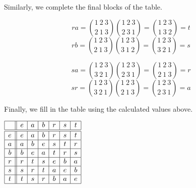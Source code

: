 \documentclass[12pt]{article}
\begin{document}
Similarly, we complete the final blocks of the table.

$$ ra ={ 1\ 2\ 3 \choose 2\ 1\ 3}{ 1\ 2\ 3 \choose 2\ 3\ 1}={ 1\ 2\ 3 \choose 1\ 3\ 2}= t$$
$$ rb ={ 1\ 2\ 3 \choose 2\ 1\ 3}{ 1\ 2\ 3 \choose 3\ 1\ 2}={ 1\ 2\ 3 \choose 3\ 2\ 1}= s$$

$$ sa ={ 1\ 2\ 3 \choose 3\ 2\ 1}{ 1\ 2\ 3 \choose 2\ 3\ 1}={ 1\ 2\ 3 \choose 2\ 1\ 3}= r$$
$$ sr ={ 1\ 2\ 3 \choose 3\ 2\ 1}{ 1\ 2\ 3 \choose 2\ 1\ 3}={ 1\ 2\ 3 \choose 2\ 3\ 1}= a$$

Finally, we fill in the table using the calculated values above.

\begin{center}
$\begin{array}{|c||c|c|c|c|c|c|}
\hline
 & e & a & b & r & s & t \\
\hline \hline
e & e & a & b & r & s & t \\
\hline
a & a & b & e & s & t & r \\
\hline
b & b & e & a & t & r & s \\
\hline
r & r & t & s & e & b & a \\
\hline
s & s & r & t & a & e & b \\
\hline
t & t & s & r & b & a & e \\
\hline \end{array}$
\end{center}
\end{document}
